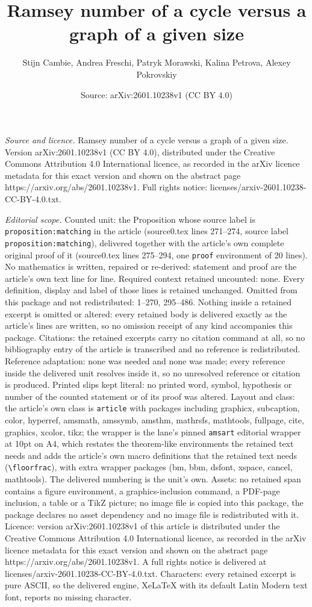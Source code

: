 \documentclass[10pt,a4paper]{amsart}
\title[Ramsey number of a cycle versus a graph of a given size]{Ramsey number of a cycle versus a graph of a given size}
\author{Stijn Cambie, Andrea Freschi, Patryk Morawski, Kalina Petrova, Alexey Pokrovskiy}
\date{Source: arXiv:2601.10238v1 (CC BY 4.0)}
\begin{document}
\maketitle

\noindent\emph{Source and licence.} Ramsey number of a cycle versus a graph of a given size. Version arXiv:2601.10238v1 (CC BY 4.0), distributed under the Creative Commons Attribution 4.0 International licence, as recorded in the arXiv licence metadata for this exact version and shown on the abstract page https://arxiv.org/abs/2601.10238v1. Full rights notice: licenses/arxiv-2601.10238-CC-BY-4.0.txt.\par\smallskip

\noindent\textit{Editorial scope.} Counted unit: the Proposition whose source label is \texttt{proposition:matching} in the article (source0.tex lines 271--274, source label \texttt{proposition:matching}), delivered together with the article's own complete original proof of it (source0.tex lines 275--294, one \texttt{proof} environment of 20 lines). No mathematics is written, repaired or re-derived: statement and proof are the article's own text line for line. Required context retained uncounted: none. Every definition, display and label of those lines is retained unchanged. Omitted from this package and not redistributed: 1--270, 295--486. Nothing inside a retained excerpt is omitted or altered: every retained body is delivered exactly as the article's lines are written, so no omission receipt of any kind accompanies this package. Citations: the retained excerpts carry no citation command at all, so no bibliography entry of the article is transcribed and no reference is redistributed. Reference adaptation: none was needed and none was made; every reference inside the delivered unit resolves inside it, so no unresolved reference or citation is produced. Printed slips kept literal: no printed word, symbol, hypothesis or number of the counted statement or of its proof was altered. Layout and class: the article's own class is \texttt{article} with packages including graphicx, subcaption, color, hyperref, amsmath, amssymb, amsthm, mathrsfs, mathtools, fullpage, cite, graphics, xcolor, tikz; the wrapper is the lane's pinned \texttt{amsart} editorial wrapper at 10pt on A4, which restates the theorem-like environments the retained text needs and adds the article's own macro definitions that the retained text needs (\texttt{\textbackslash floorfrac}), with extra wrapper packages (bm, bbm, dsfont, xspace, cancel, mathtools). The delivered numbering is the unit's own. Assets: no retained span contains a figure environment, a graphics-inclusion command, a PDF-page inclusion, a table or a TikZ picture; no image file is copied into this package, the package declares no asset dependency and no image file is redistributed with it. Licence: version arXiv:2601.10238v1 of this article is distributed under the Creative Commons Attribution 4.0 International licence, as recorded in the arXiv licence metadata for this exact version and shown on the abstract page https://arxiv.org/abs/2601.10238v1. A full rights notice is delivered at licenses/arxiv-2601.10238-CC-BY-4.0.txt. Characters: every retained excerpt is pure ASCII, so the delivered engine, XeLaTeX with its default Latin Modern text font, reports no missing character.
\end{document}
